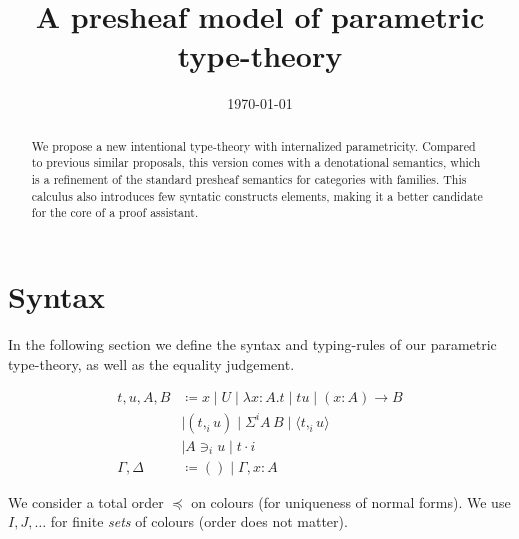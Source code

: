 \documentclass{PaperTools/latex/llncs}
\title{A presheaf model of parametric type-theory}
\author{}
\date{\today}
\newcommand\CP[3]{(#2,_{#1} #3)}
\newcommand\param[1]{\!\cdot\!#1}
\newcommand\op[1]{∋_{#1}}
\newcommand\ip[3]{Σ^{#1} {#2}\,{#3}}
\newcommand\fp[3]{⟨#2 ,_{#1} #3⟩}
\begin{document}
\maketitle

\begin{abstract}
  We propose a new intentional type-theory with internalized
  parametricity. Compared to previous similar proposals, this version
  comes with a denotational semantics, which is a refinement of the
  standard presheaf semantics for categories with families.
  This calculus also introduces few syntatic constructs elements, making
  it a better candidate for the core of a proof assistant.
\end{abstract}

\section{Syntax}
In the following section we define the syntax and typing-rules of our
parametric type-theory, as well as the equality judgement.

\begin{definition}
  \begin{align*}
    t,u,A,B & \coloneqq x \mid U \mid λx:A. t      \mid t u \mid (x:A) → B \\
            & \mid \CP i t u  \mid \ip i A B  \mid \fp i t u \\
            & \mid A \op i u \mid t \param i  \\
    \Gamma,\Delta & \coloneqq () \mid \Gamma,x:A
  \end{align*}
\end{definition}

We consider a total order $\preccurlyeq$ on colours (for uniqueness of
normal forms).
We use $I,J,…$ for finite {\em sets} of colours (order does not matter).
\end{document}
